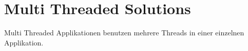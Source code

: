\section{Multi Threaded Solutions}
\label{section: Multi Threaded Solutions}

Multi Threaded Applikationen benutzen mehrere Threads in einer einzelnen Applikation. \cite[p. 1]{DabMIT}


\label{section: Multi Threaded Solutions}

\cite[p. 2]{Sch97}